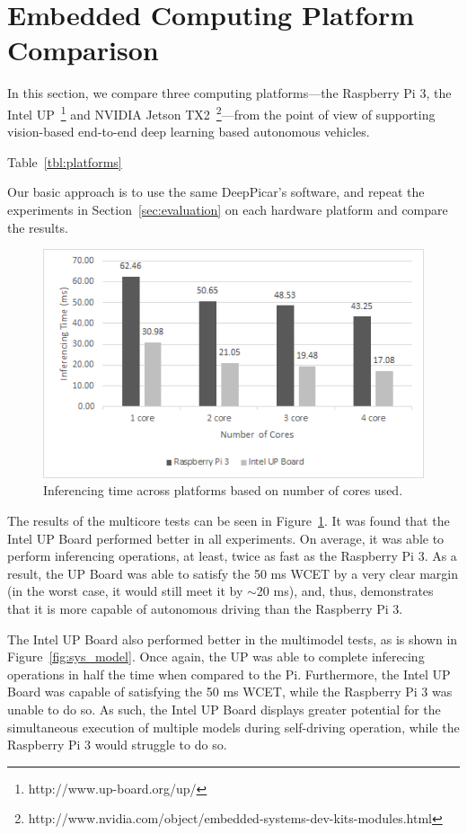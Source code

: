 
%

\section{Embedded Computing Platform Comparison}\label{sec:comparison}

In this section, we compare three computing platforms---the Raspberry
Pi 3, the Intel UP~\footnote{http://www.up-board.org/up/} and NVIDIA
Jetson
TX2~\footnote{http://www.nvidia.com/object/embedded-systems-dev-kits-modules.html}---from
the point of view of supporting vision-based end-to-end deep learning
based autonomous vehicles.

Table~\ref{tbl:platforms}
  
Our basic approach is to use the same DeepPicar's software, and repeat
the experiments in Section~\ref{sec:evaluation} on each hardware
platform and compare the results.



\begin{figure}[h]
  \centering
  \includegraphics[width=.5\textwidth]{figs/system_multicore}
  \caption{Inferencing time across platforms based on number of cores used.}
  \label{fig:sys_core}
\end{figure}

The results of the multicore tests can be seen in Figure~\ref{fig:sys_core}. It was found that the 
Intel UP Board performed better in all experiments. On average, it was able to perform inferencing 
operations, at least, twice as fast as the Raspberry Pi 3. As a result, the UP Board was able to 
satisfy the 50 ms WCET by a very clear margin (in the worst case, it would still meet it by $\sim$20 
ms), and, thus, demonstrates that it is more capable of autonomous driving than the Raspberry Pi 3.

The Intel UP Board also performed better in the multimodel tests, as is shown in 
Figure~\ref{fig:sys_model}. Once again, the UP was able to complete inferecing operations in half the 
time when compared to the Pi. Furthermore, the Intel UP Board was capable of satisfying the 50 ms 
WCET, while the Raspberry Pi 3 was unable to do so. As such, the Intel UP Board displays greater 
potential for the simultaneous execution of multiple models during self-driving operation, while the 
Raspberry Pi 3 would struggle to do so.

